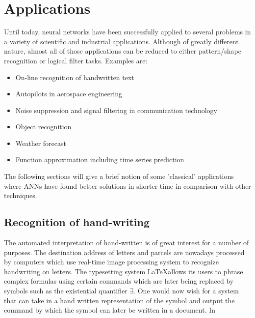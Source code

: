 \documentclass[10pt,a4paper,DIV=11]{scrreprt}
\begin{document}
\section{Applications}
Until today, neural networks have been successfully applied to several problems in a variety of scientific and industrial applications. Although of greatly different nature, almost all of those applications can be reduced to either pattern/shape recognition or logical filter tasks. Examples are:\\
\begin{itemize}
    \item On-line recognition of handwritten text
    \item Autopilots in aerospace engineering
    \item Noise suppression and signal filtering in communication technology 
    \item Object recognition
    \item Weather forecast
    \item Function approximation including time series prediction
\end{itemize}

The following sections will give a brief notion of some 'classical' applications where ANNs have found better solutions in shorter time in comparison with other techniques.
\subsection{Recognition of hand-writing}
The automated interpretation of hand-written is of great interest for a number of purposes. The destination address of letters and parcels are nowadays processed by computers which use real-time image processing system to recognize handwriting on letters. The typesetting system \LaTeX  allows its users to phrase complex formulas using certain commands which are later being replaced by symbols such as the existential quantifier $\exists$. 
One would now wish for a system that can take in a hand written representation of the symbol and output the command by which the symbol can later be written in a document. In %
\\
\end{document}
